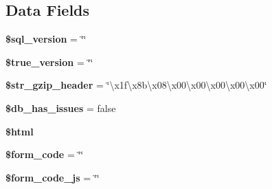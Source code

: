 \subsection*{Data Fields}
\begin{DoxyCompactItemize}
\item 
\hypertarget{classadmin__core__sql__toolbox__module_ac57530d0e62e2777126788caf0ea0d92}{{\bfseries \$sql\-\_\-version} = \char`\"{}\char`\"{}}\label{classadmin__core__sql__toolbox__module_ac57530d0e62e2777126788caf0ea0d92}

\item 
\hypertarget{classadmin__core__sql__toolbox__module_aca7b9f139498f07b5604ae26f258b826}{{\bfseries \$true\-\_\-version} = \char`\"{}\char`\"{}}\label{classadmin__core__sql__toolbox__module_aca7b9f139498f07b5604ae26f258b826}

\item 
\hypertarget{classadmin__core__sql__toolbox__module_a380550c7a7ca9372e86ffc5653400feb}{{\bfseries \$str\-\_\-gzip\-\_\-header} = \char`\"{}\textbackslash{}x1f\textbackslash{}x8b\textbackslash{}x08\textbackslash{}x00\textbackslash{}x00\textbackslash{}x00\textbackslash{}x00\textbackslash{}x00\char`\"{}}\label{classadmin__core__sql__toolbox__module_a380550c7a7ca9372e86ffc5653400feb}

\item 
\hypertarget{classadmin__core__sql__toolbox__module_adb86a853ba94b2aa0ee02eb7fe333781}{{\bfseries \$db\-\_\-has\-\_\-issues} = false}\label{classadmin__core__sql__toolbox__module_adb86a853ba94b2aa0ee02eb7fe333781}

\item 
\hypertarget{classadmin__core__sql__toolbox__module_a6f96e7fc92441776c9d1cd3386663b40}{{\bfseries \$html}}\label{classadmin__core__sql__toolbox__module_a6f96e7fc92441776c9d1cd3386663b40}

\item 
\hypertarget{classadmin__core__sql__toolbox__module_af28aee726fa3eb6c355d08a2ab655e03}{{\bfseries \$form\-\_\-code} = \char`\"{}\char`\"{}}\label{classadmin__core__sql__toolbox__module_af28aee726fa3eb6c355d08a2ab655e03}

\item 
\hypertarget{classadmin__core__sql__toolbox__module_ac68fe8a02a2efd63c3271179f4b4fbb7}{{\bfseries \$form\-\_\-code\-\_\-js} = \char`\"{}\char`\"{}}\label{classadmin__core__sql__toolbox__module_ac68fe8a02a2efd63c3271179f4b4fbb7}

\end{DoxyCompactItemize}

